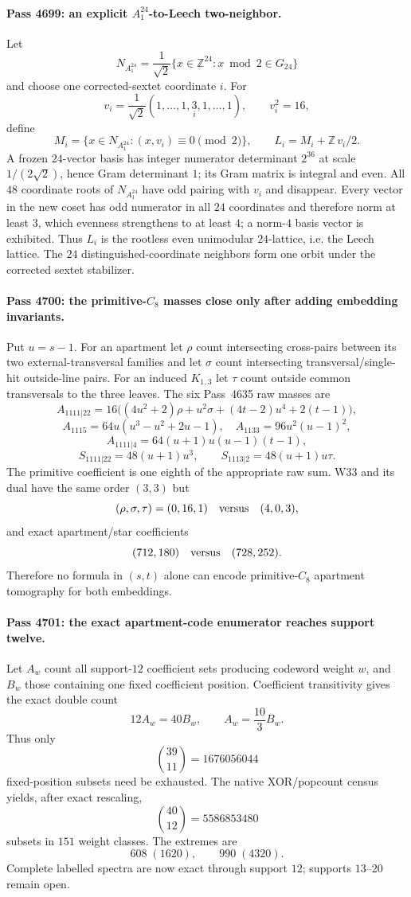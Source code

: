 \paragraph{Pass 4699: an explicit $A_1^{24}$-to-Leech two-neighbor.}
Let
\[
N_{A_1^{24}}=\frac1{\sqrt2}\{x\in\mathbb Z^{24}:x\bmod2\in G_{24}\}
\]
and choose one corrected-sextet coordinate $i$.  For
\[
v_i=\frac1{\sqrt2}(1,\ldots,1,\underset{i}{3},1,\ldots,1),\qquad v_i^2=16,
\]
define
\[
M_i=\{x\in N_{A_1^{24}}:(x,v_i)\equiv0\pmod2\},\qquad
L_i=M_i+\mathbb Z\,v_i/2.
\]
A frozen $24$-vector basis has integer numerator determinant $2^{36}$ at scale $1/(2\sqrt2)$, hence Gram determinant $1$; its Gram matrix is integral and even.  All $48$ coordinate roots of $N_{A_1^{24}}$ have odd pairing with $v_i$ and disappear.  Every vector in the new coset has odd numerator in all $24$ coordinates and therefore norm at least $3$, which evenness strengthens to at least $4$; a norm-$4$ basis vector is exhibited.  Thus $L_i$ is the rootless even unimodular $24$-lattice, i.e. the Leech lattice.  The $24$ distinguished-coordinate neighbors form one orbit under the corrected sextet stabilizer.

\paragraph{Pass 4700: the primitive-$C_8$ masses close only after adding embedding invariants.}
Put $u=s-1$.  For an apartment let $\rho$ count intersecting cross-pairs between its two external-transversal families and let $\sigma$ count intersecting transversal/single-hit outside-line pairs.  For an induced $K_{1,3}$ let $\tau$ count outside common transversals to the three leaves.  The six Pass~4635 raw masses are
\[
A_{1111|22}=16\big((4u^2+2)\rho+u^2\sigma+(4t-2)u^4+2(t-1)\big),
\]
\[
A_{1115}=64u(u^3-u^2+2u-1),\quad
A_{1133}=96u^2(u-1)^2,
\]
\[
A_{1111|4}=64(u+1)u(u-1)(t-1),
\]
\[
S_{1111|22}=48(u+1)u^3,\qquad
S_{1113|2}=48(u+1)u\tau.
\]
The primitive coefficient is one eighth of the appropriate raw sum.  W33 and its dual have the same order $(3,3)$ but
\[
(\rho,\sigma,\tau)=(0,16,1)\quad\hbox{versus}\quad(4,0,3),
\]
and exact apartment/star coefficients
\[
(712,180)\quad\hbox{versus}\quad(728,252).
\]
Therefore no formula in $(s,t)$ alone can encode primitive-$C_8$ apartment tomography for both embeddings.

\paragraph{Pass 4701: the exact apartment-code enumerator reaches support twelve.}
Let $A_w$ count all support-$12$ coefficient sets producing codeword weight $w$, and $B_w$ those containing one fixed coefficient position.  Coefficient transitivity gives the exact double count
\[
12A_w=40B_w,
\qquad A_w=\frac{10}{3}B_w.
\]
Thus only
\[
\binom{39}{11}=1676056044
\]
fixed-position subsets need be exhausted.  The native XOR/popcount census yields, after exact rescaling,
\[
\binom{40}{12}=5586853480
\]
subsets in $151$ weight classes.  The extremes are
\[
608\;(1620),\qquad 990\;(4320).
\]
Complete labelled spectra are now exact through support $12$; supports $13$--$20$ remain open.

